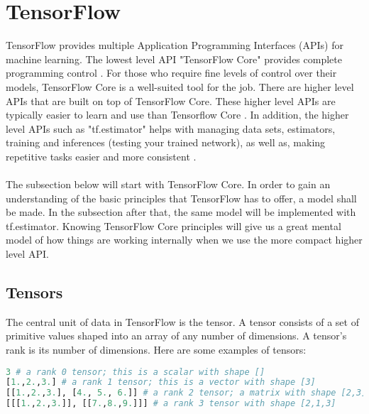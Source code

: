 \section{TensorFlow}
TensorFlow provides multiple Application Programming Interfaces
(APIs) for machine learning. 
The lowest level API "TensorFlow Core" provides complete programming control \cite{tensorflow2015-whitepaper}. 
For those who require fine levels of control over their models,
TensorFlow Core is a well-suited tool for the job. There are higher level APIs that are built on top of TensorFlow Core.
These higher level APIs are typically easier to learn and use than Tensorflow Core \cite{tensorflow2015-whitepaper}.
In addition, the higher level APIs such as "tf.estimator" helps with managing data sets, estimators,
training and inferences (testing your trained network),
as well as, making repetitive tasks easier and more consistent
\cite{tensorflow2015-whitepaper}.\\\\
The subsection below will start with TensorFlow Core. 
In order to gain an understanding of the basic principles that TensorFlow has to offer, a model shall be made. 
In the subsection after that, the same model will be implemented with tf.estimator. 
Knowing TensorFlow Core principles will give us a great mental model of how things are working internally when we use the more compact higher level API.

\subsection{Tensors}
The central unit of data in TensorFlow is the tensor. 
A tensor consists of a set of primitive values shaped into an array of any number of dimensions. 
A tensor's rank is its number of dimensions. 
Here are some examples of tensors:
\begin{lstlisting}[language=Python, caption=Tensor examples.]
3 # a rank 0 tensor; this is a scalar with shape []
[1.,2.,3.] # a rank 1 tensor; this is a vector with shape [3]
[[1.,2.,3.], [4., 5., 6.]] # a rank 2 tensor; a matrix with shape [2,3]
[[[1.,2.,3.]], [[7.,8.,9.]]] # a rank 3 tensor with shape [2,1,3]
\end{lstlisting} 

